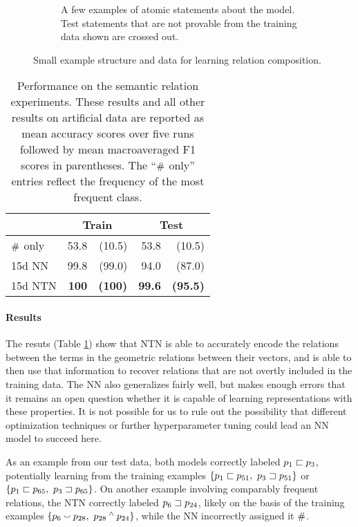 \begin{figure}[t]
\begin{subfigure}[t]{0.43\textwidth}
\begin{tabular}[b]{c  c}
      \bottomrule
    \end{tabular}

    \caption{A few examples of atomic statements about the
      model.  Test statements that are not provable from the training data shown are
      crossed out.}
  \end{subfigure}  
  \caption{Small example structure and data for learning relation composition.}
  \label{lattice-figure}
\end{figure} 

\begin{table}[tp]
  \centering\small
  \begin{tabular}{ l r@{ \ }r r@{ \ }r }
    \toprule
    ~&\multicolumn{2}{c}{Train} & \multicolumn{2}{c}{Test}\\
    \midrule
    $\mathbin{\#}$ only &53.8 &(10.5)    &53.8 &(10.5) \\
    15d NN &				99.8&	(99.0) &94.0&(87.0) \\
    15d NTN 				& \textbf{100} & \textbf{(100)} & \textbf{99.6} & \textbf{(95.5)}\\
    \bottomrule
  \end{tabular}
  
  
  \caption{Performance on the semantic relation experiments. These results and all other results on artificial data are reported as mean accuracy scores over five runs followed by mean macroaveraged F1 scores in parentheses. The ``$\mathbin{\#}$ only'' entries reflect the frequency of the most frequent class.}
  \label{joinresultstable}
\end{table}

\paragraph{Results} 
The resuts (Table \ref{joinresultstable}) show that NTN is able to accurately encode the relations between the terms in the geometric relations between their vectors, 
and is able to then use that information to recover relations that 
are not overtly included in the training data. The NN also generalizes fairly well, 
but makes enough errors that it remains an open question whether 
it is capable of learning representations with these properties. 
It is not possible for us to rule out the possibility that different optimization techniques or
further hyperparameter tuning could lead an NN model to succeed here.

As an example from our test data, both models correctly labeled $p_1 \sqsubset p_3$, potentially learning from the training examples $\{p_1 \sqsubset p_{51},~p_3 \sqsupset p_{51}\}$ or $\{p_1\sqsubset p_{65},~p_3 \sqsupset p_{65} \}$. On another example involving comparably frequent relations, the NTN correctly labeled $p_6 \sqsupset p_{24}$, likely on the basis of the training examples $\{p_6 \mathbin{\smallsmile} p_{28},~p_{28} \mathbin{^{\wedge}} p_{24}\}$, while the NN incorrectly assigned it $\mathbin{\#}$.

